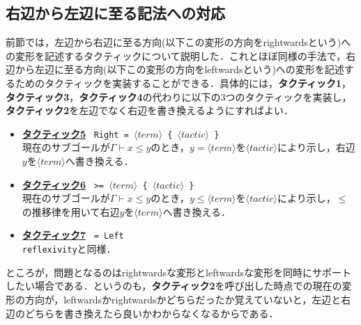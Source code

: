 \documentclass[submit]{ipsj}
\begin{document}
\subsection{右辺から左辺に至る記法への対応}

前節では，左辺から右辺に至る方向(以下この変形の方向をrightwardsという)への変形を記述するタクティックについて説明した．これとほぼ同様の手法で，右辺から左辺に至る方向(以下この変形の方向をleftwardsという)への変形を記述するためのタクティックを実装することができる．具体的には，{\gtfamily\bfseries タクティック1}，{\gtfamily\bfseries タクティック3}，{\gtfamily\bfseries タクティック4}の代わりに以下の3つのタクティックを実装し，{\gtfamily\bfseries タクティック2}を左辺でなく右辺を書き換えるようにすればよい．
\begin{itemize}
\item \underline{\gtfamily\bfseries タクティック5}~  \verb+Right = +$\langle\mathit{term}\rangle$\verb+ { +$\langle\mathit{tactic}\rangle$\verb+ }+\\現在のサブゴールが$\varGamma \vdash x \leq y$のとき，$y = \langle\mathit{term}\rangle$を$\langle\mathit{tactic}\rangle$により示し，右辺$y$を$\langle\mathit{term}\rangle$へ書き換える．
\item \underline{\gtfamily\bfseries タクティック6}~ \verb+>= +$\langle\mathit{term}\rangle$\verb+ { +$\langle\mathit{tactic}\rangle$\verb+ }+\\現在のサブゴールが$\varGamma \vdash x \leq y$のとき，$y \leq \langle\mathit{term}\rangle$を$\langle\mathit{tactic}\rangle$により示し，$\leq$の推移律を用いて右辺$y$を$\langle\mathit{term}\rangle$へ書き換える．
\item \underline{\gtfamily\bfseries タクティック7}~ \verb+= Left+\\\verb+reflexivity+と同様．
\end{itemize}
ところが，問題となるのはrightwardsな変形とleftwardsな変形を同時にサポートしたい場合である．というのも，{\gtfamily\bfseries タクティック2}を呼び出した時点での現在の変形の方向が，leftwardsかrightwardsかどちらだったか覚えていないと，左辺と右辺のどちらを書き換えたら良いかわからなくなるからである．
\end{document}

